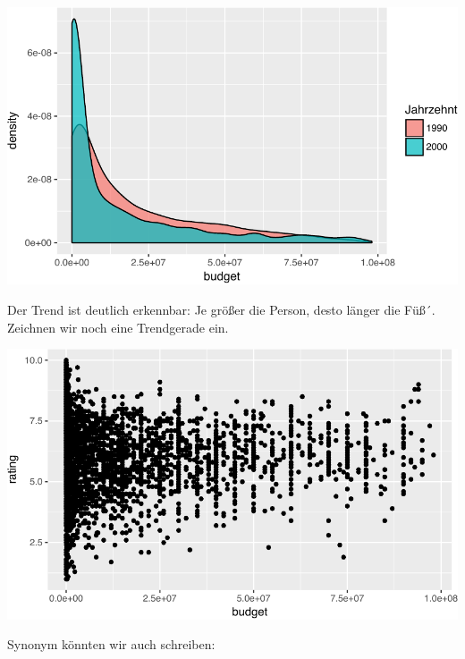 \documentclass[12pt,ngerman,]{book}
\newenvironment{Shaded}{\begin{snugshade}}{\end{snugshade}}
\newcommand{\KeywordTok}[1]{\textcolor[rgb]{0.13,0.29,0.53}{\textbf{{#1}}}}
\newcommand{\DataTypeTok}[1]{\textcolor[rgb]{0.13,0.29,0.53}{{#1}}}
\newcommand{\DecValTok}[1]{\textcolor[rgb]{0.00,0.00,0.81}{{#1}}}
\newcommand{\StringTok}[1]{\textcolor[rgb]{0.31,0.60,0.02}{{#1}}}
\newcommand{\NormalTok}[1]{{#1}}
\renewenvironment{Shaded}{\begin{kframe}}{\end{kframe}}
\begin{document}
\begin{center}\includegraphics[width=0.7\linewidth]{050_Daten_visualisieren_files/figure-latex/unnamed-chunk-13-1} \end{center}

Der Trend ist deutlich erkennbar: Je größer die Person, desto länger die
Füß´. Zeichnen wir noch eine Trendgerade ein.

\begin{Shaded}
\end{Shaded}

\begin{center}\includegraphics[width=0.7\linewidth]{050_Daten_visualisieren_files/figure-latex/unnamed-chunk-14-1} \end{center}

Synonym könnten wir auch schreiben:
\end{document}
